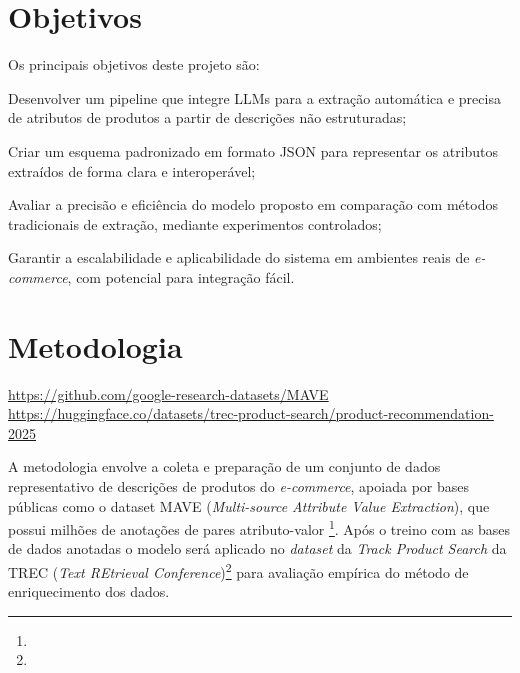 \section{Objetivos} %


Os principais objetivos deste projeto são:
\begin{enumerate*}
    \item Desenvolver um pipeline que integre LLMs para a extração automática e precisa de atributos de produtos a partir de descrições não estruturadas;
    \item Criar um esquema padronizado em formato JSON para representar os atributos extraídos de forma clara e interoperável;
    \item Avaliar a precisão e eficiência do modelo proposto em comparação com métodos tradicionais de extração, mediante experimentos controlados;
    \item Garantir a escalabilidade e aplicabilidade do sistema em ambientes reais de \textit{e-commerce}, com potencial para integração fácil.
\end{enumerate*}

\section{Metodologia} %

\urldef\maveurl\url{https://github.com/google-research-datasets/MAVE}
\urldef\trecurl\url{https://huggingface.co/datasets/trec-product-search/product-recommendation-2025}

A metodologia envolve a coleta e preparação de um conjunto de dados representativo de descrições de produtos do \textit{e-commerce}, apoiada por bases públicas como o dataset MAVE (\textit{Multi-source Attribute Value Extraction}), que possui milhões de anotações de pares atributo-valor \citet{MAVE2024}\footnote{\maveurl}. Após o treino com as bases de dados anotadas o modelo será aplicado no \textit{dataset} da \textit{Track Product Search} da TREC (\textit{Text REtrieval Conference})\footnote{\trecurl} \citet{TRECProduct2022} para avaliação empírica do método de enriquecimento dos dados.

